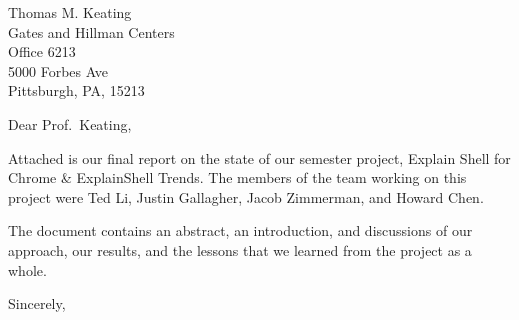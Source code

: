 \documentclass{letter}
\begin{document}
\begin{letter}{Thomas M. Keating\\
               Gates and Hillman Centers\\
               Office 6213\\
               5000 Forbes Ave\\
               Pittsburgh, PA, 15213}
\opening{Dear Prof.\ Keating,}

Attached is our final report on the state of our semester project, Explain Shell
for Chrome \& ExplainShell Trends. The members of the team working on this
project were Ted Li, Justin Gallagher, Jacob Zimmerman, and Howard Chen.

The document contains an abstract, an introduction, and discussions of our
approach, our results, and the lessons that we learned from the project as a
whole.

\closing{Sincerely,}

\end{letter}
\end{document}
